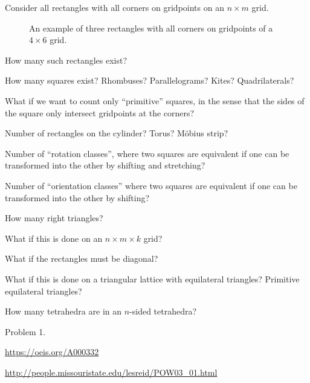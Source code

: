 \documentclass{article}
\begin{document}
Consider all rectangles with all corners on gridpoints on an $n \times m$ grid.
\begin{figure}[!h]
  \centering
  \caption{
    An example of three rectangles with all corners on gridpoints of a
    $4 \times 6$ grid.
  }
\end{figure}

\begin{question}
  How many such rectangles exist?
\end{question}
\begin{related}
  \item How many squares exist? Rhombuses? Parallelograms? Kites? Quadrilaterals?
  \item What if we want to count only ``primitive'' squares, in the sense that
    the sides of the square only intersect gridpoints at the corners?
  \item Number of rectangles on the cylinder? Torus? M\"obius strip?
  \item Number of ``rotation classes'', where two squares are equivalent if
    one can be transformed into the other by shifting and stretching?
  \item Number of ``orientation classes'' where two squares are equivalent if
    one can be transformed into the other by shifting?
  \item How many right triangles?
  \item What if this is done on an $n \times m \times k$ grid?
  \item What if the rectangles must be diagonal?
  \item What if this is done on a triangular lattice with equilateral triangles?
    Primitive equilateral triangles?
  \item How many tetrahedra are in an $n$-sided tetrahedra?
\end{related}
\begin{references}
  \item Problem 1.
  \item \url{https://oeis.org/A000332}
  \item \url{http://people.missouristate.edu/lesreid/POW03_01.html}
\end{references}
\end{document}
